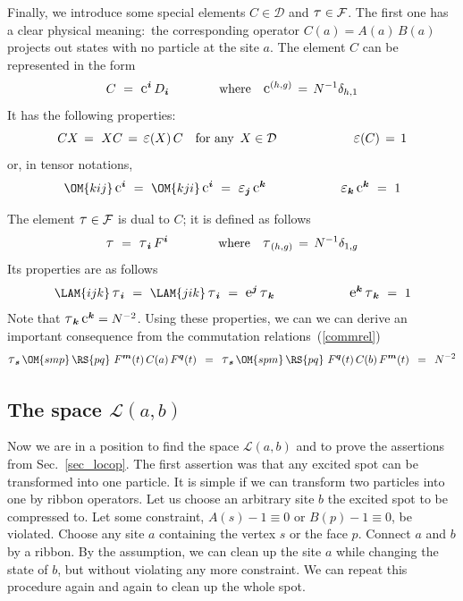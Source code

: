 \documentclass[12pt]{article}
\newcommand{\Eps}{\mbox{\large$\varepsilon$}}
\newcommand{\Tau}{\mbox{\large$\tau$}}
\newcommand{\rE}{\mbox{\large$\mathrm e$}}
\newcommand{\rC}{\mbox{\large$\mathrm c$}}
\newcommand{\del}{\delta} %
\newcommand*{\boldind}[1]{{\mbox{\scriptsize\boldmath$#1$}}}
\newcommand*{\RD}[1]{D_\boldind{#1}}
\newcommand*{\RF}[1]{F^\boldind{#1}}
\newcommand*{\EPS}[1]{\Eps_\boldind{#1}}
\newcommand*{\TAU}[1]{\Tau_\boldind{#1}}
\newcommand*{\RE}[1]{\rE^\boldind{#1}}
\newcommand*{\RC}[1]{\rC^\boldind{#1}}
\newcommand{\calD}{\mathcal{D}}
\newcommand{\calF}{\mathcal{F}}
\newcommand{\calL}{\mathcal{L}}
\begin{document}
Finally, we introduce some special elements $C\in\calD$ and $\Tau\in\calF$.
The first one has a clear physical meaning:\, the corresponding operator
$C(a)=A(a)\,B(a)$ projects out states with no particle at the site $a$. The
element $C$ can be represented in the form
\begin{equation} \label{C}
  C\ =\ \RC{i}\,\RD{i} \qquad\qquad
  \mbox{where}\quad \rC^{(h,g)}\,=\,N^{-1}\del_{h,1}
\end{equation}
It has the following properties:
\[
  CX\, =\ XC\, =\, \Eps(X)\,C \quad \mbox{for any}\,\ X\in\calD\,
 \qquad\qquad\qquad  \Eps(C)\, =\, 1
\]
or, in tensor notations,
\begin{equation}
  \OM{kij}\,\RC{i}\ =\ \OM{kji}\,\RC{i}\ =\ \EPS{j}\,\RC{k} 
  \qquad\qquad\qquad  \EPS{k}\,\RC{k}\ =\ 1
\end{equation}

The element $\Tau\in\calF$ is dual to $C$; it is defined as follows
\begin{equation} \label{Tau}
  \Tau\ =\ \TAU{i}\,\RF{i} \qquad\qquad
  \mbox{where}\quad \Tau_{(h,g)}\,=\,N^{-1}\del_{1,g}
\end{equation}
Its properties are as follows
\begin{equation}
  \LAM{ijk}\,\TAU{i}\ =\ \LAM{jik}\,\TAU{i}\ =\ \RE{j}\,\TAU{k}
  \qquad\qquad\qquad \RE{k}\,\TAU{k}\ =\ 1
\end{equation}
Note that $\TAU{k}\,\RC{k}=N^{-2}$. Using these properties, we can we can
derive an important consequence from the commutation relations~(\ref{commrel})
\begin{equation} \label{relC}
  \TAU{s}\,\OM{smp}\,\RS{pq}\ \RF{m}(t)\, C(a)\, \RF{q}(t)\,\ =\,\ 
  \TAU{s}\,\OM{spm}\,\RS{pq}\ \RF{q}(t)\, C(b)\, \RF{m}(t)\,\ =\,\  N^{-2}
\end{equation}


\subsection{The space $\calL(a,b)$} \label{sec_spaceL}

Now we are in a position to find the space $\calL(a,b)$ and to prove the
assertions from Sec.~\ref{sec_locop}. The first assertion was that any excited
spot can be transformed into one particle. It is simple if we can transform 
two particles into one by ribbon operators. Let us choose an arbitrary site 
$b$ the excited spot to be compressed to. Let some constraint, 
$A(s)-1\equiv 0$ or $B(p)-1\equiv 0$, be violated. Choose any site $a$ 
containing the vertex $s$ or the face $p$. Connect $a$ and $b$ by a ribbon. 
By the assumption, we can clean up the site $a$ while changing the state of
$b$, but without violating any more constraint. We can repeat this procedure
again and again to clean up the whole spot.
\end{document}
